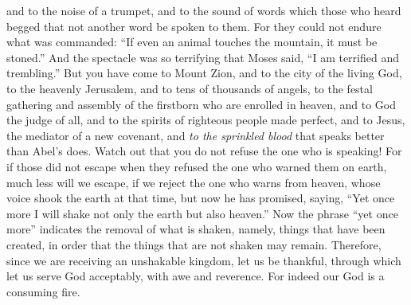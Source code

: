 \begin{biblechapter}
\verse and to the noise of a trumpet, and to the sound of words which those who heard begged that not another word be spoken to them.
\verse For they could not endure what was commanded: “If even an animal touches the mountain, it must be stoned.”
\verse And the spectacle was so terrifying that Moses said, “I am terrified and trembling.”
\verse But you have come to Mount Zion, and to the city of the living God, to the heavenly Jerusalem, and to tens of thousands of angels, to the festal gathering
\verse and assembly of the firstborn who are enrolled in heaven, and to God the judge of all, and to the spirits of righteous people made perfect,
\verse and to Jesus, the mediator of a new covenant, and \textit{to the sprinkled blood} that speaks better than Abel’s does.
\verse Watch out that you do not refuse the one who is speaking! For if those did not escape when they refused the one who warned them on earth, much less will we escape, if we reject the one who warns from heaven,
\verse whose voice shook the earth at that time, but now he has promised, saying, “Yet once more I will shake not only the earth but also heaven.”
\verse Now the phrase “yet once more” indicates the removal of what is shaken, namely, things that have been created, in order that the things that are not shaken may remain.
\verse Therefore, since we are receiving an unshakable kingdom, let us be thankful, through which let us serve God acceptably, with awe and reverence.
\verse For indeed our God is a consuming fire.
\end{biblechapter}


